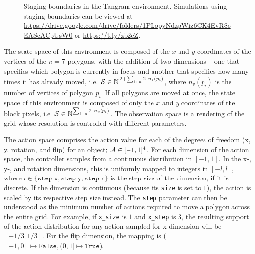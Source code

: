 \begin{figure}[h]
    \centering
    \caption[Staging boundaries in the Tangram environment.]{Staging boundaries in the Tangram environment. Simulations using staging boundaries can be viewed at \url{https://drive.google.com/drive/folders/1PLopyNdzpWiz6CK4EvR8oEAScACpUsW0} or \url{https://t.ly/zb2cZ}.}
    \label{fig:staging-boundaries}
\end{figure}

The state space of this environment is composed of the \(x\) and \(y\) coordinates of the vertices of the \(n = 7\) polygons, with the addition of two dimensions -- one that specifies which polygon is currently in focus and another that specifies how many times it has already moved, i.e. \(\mathcal{S} \in \mathbb{N}^{\,2 + \sum_{i \in n} 2\ n_v(p_i)}\), where \(n_v(p_i)\) is the number of vertices of polygon \(p_i\).
If all polygons are moved at once, the state space of this environment is composed of only the \(x\) and \(y\) coordinates of the block pixels, i.e. \(\mathcal{S} \in \mathbb{N}^{\sum_{i \in n} 2\ n_v(p_i)}\).
The observation space is a rendering of the grid whose resolution is controlled with different parameters.

The action space comprises the action value for each of the degrees of freedom (x, y, rotation, and flip) for an object; \(\mathcal{A} \in [-1, 1]^4\).
For each dimension of the action space, the controller samples from a continuous distribution in \([-1, 1]\).
In the x-, y-, and rotation dimensions, this is uniformly mapped to integers in \([-l, l]\), where \(l \in \{\texttt{step\_x}, \texttt{step\_y}, \texttt{step\_r}\}\) is the step size of the dimension, if it is discrete.
If the dimension is continuous (because its \texttt{size} is set to \(1\)), the action is scaled by its respective step size instead.
The \texttt{step} parameter can then be understood as the minimum number of actions required to move a polygon across the entire grid.
For example, if \texttt{x\_size} is \(1\) and \texttt{x\_step} is \(3\), the resulting support of the action distribution for any action sampled for x-dimension will be \([-1/3, 1/3]\).
For the flip dimension, the mapping is (\([-1, 0] \mapsto \texttt{False}, (0, 1] \mapsto \texttt{True}\)).

